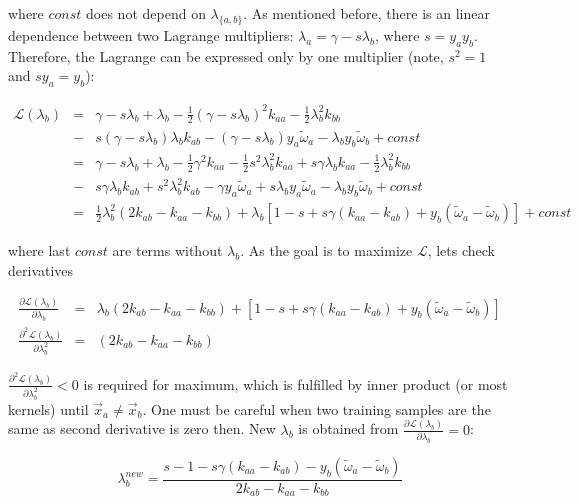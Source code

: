 where $const$ does not depend on $\lambda_{\{a,b\}}$. As mentioned before, there is an linear dependence between two Lagrange multipliers: $\lambda_a = \gamma - s\lambda_b$, where $s = y_a y_b$. Therefore, the Lagrange can be expressed only by one multiplier (note, $s^2 = 1$ and $sy_a = y_b$):

\begin{eqnarray}
 \mathcal{L} (\lambda_b) & = & \gamma - s\lambda_b + \lambda_b -\frac{1}{2}\left(\gamma - s\lambda_b\right)^2k_{aa} - \frac{1}{2}\lambda_b^2k_{bb} \\ \nonumber
 & - & s \left(\gamma - s\lambda_b\right) \lambda_b k_{ab} - \left(\gamma - s\lambda_b\right)y_a \tilde\omega_a - \lambda_b y_b \tilde\omega_b + const \\ \nonumber
 & = & \gamma - s\lambda_b + \lambda_b - \frac{1}{2}\gamma^2k_{aa} -\frac{1}{2}s^2\lambda_b^2k_{aa} + s \gamma \lambda_b k_{aa} - \frac{1}{2}\lambda_b^2k_{bb} \\ \nonumber
 & - & s\gamma\lambda_b k_{ab} + s^2 \lambda_b^2k_{ab} - \gamma y_a \tilde\omega_a + s\lambda_b y_a \tilde\omega_a - \lambda_b y_b \tilde\omega_b + const \\ \nonumber
 & = & \frac{1}{2}\lambda_b^2\left(2k_{ab} - k_{aa} - k_{bb}\right) + \lambda_b\left[1 - s + s\gamma(k_{aa} - k_{ab}) + y_b(\tilde\omega_a - \tilde\omega_b) \right] + const
\end{eqnarray}

where last $const$ are terms without $\lambda_b$. As the goal is to maximize $\mathcal{L}$, lets check derivatives

\begin{eqnarray}
 \frac{\partial\mathcal{L} (\lambda_b)}{\partial\lambda_b} & = & \lambda_b\left(2k_{ab} - k_{aa} - k_{bb}\right) + \left[1 - s + s\gamma(k_{aa} - k_{ab}) + y_b(\tilde\omega_a - \tilde\omega_b) \right] \nonumber \\
 \frac{\partial^2\mathcal{L} (\lambda_b)}{\partial\lambda_b^2} & = & \left(2k_{ab} - k_{aa} - k_{bb}\right)
\end{eqnarray}

$\frac{\partial^2\mathcal{L} (\lambda_b)}{\partial\lambda_b^2} < 0$ is required for maximum, which is fulfilled by inner product (or most kernels) until $\vec x_a \neq \vec x_b$. One must be careful when two training samples are the same as second derivative is zero then. New $\lambda_b$ is obtained from $\frac{\partial\mathcal{L} (\lambda_b)}{\partial\lambda_b} = 0$:

\begin{equation}
 \lambda_b^{new} = \frac{s - 1 - s\gamma(k_{aa} - k_{ab}) - y_b(\tilde\omega_a - \tilde\omega_b)}{2k_{ab} - k_{aa} - k_{bb}}
\end{equation}

